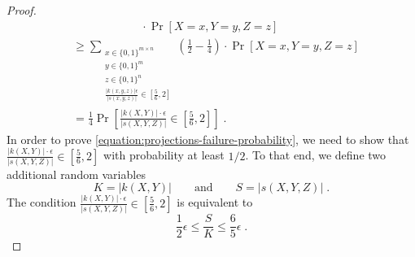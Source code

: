 \begin{proof}
\begin{align*}
& \qquad \qquad \qquad  \cdot \Pr \left[X = x, Y = y, Z = z \right] \\
& \ge
\sum_{\substack{x \in \{0,1\}^{m \times n} \\ y \in \{0,1\}^m \\ z \in \{0,1\}^n \\ \frac{|k(x,y,z)| \epsilon}{|s(x,y,z)|} \in [\frac{5}{6},2]}} \left( \frac{1}{2} - \frac{1}{4} \right) \cdot \Pr \left[X = x, Y = y, Z = z \right] \\
& =
\frac{1}{4} \Pr \left[ \frac{|k(X,Y)| \cdot \epsilon}{|s(X,Y,Z)|} \in \left[\frac{5}{6}, 2 \right]  \right] \; .
\end{align*}
In order to prove \eqref{equation:projections-failure-probability}, we need to show that
$\frac{|k(X,Y)| \cdot \epsilon}{|s(X,Y,Z)|} \in \left[\frac{5}{6}, 2 \right]$ with
probability at least $1/2$. To that end, we define two additional random
variables
$$
K = |k(X,Y)| \qquad \text{and} \qquad S = |s(X,Y,Z)| \; .
$$
The condition $\frac{|k(X,Y)| \cdot \epsilon}{|s(X,Y,Z)|} \in \left[\frac{5}{6}, 2 \right]$ is equivalent to
\begin{equation}
\label{equation:ratio-condition}
\frac{1}{2} \epsilon \le \frac{S}{K} \le \frac{6}{5} \epsilon \; .
\end{equation}


\end{proof}
